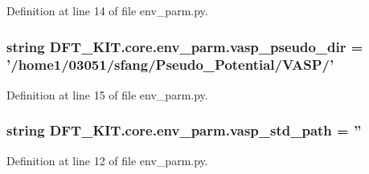 Definition at line 14 of file env\+\_\+parm.\+py.

\hypertarget{namespace_d_f_t___k_i_t_1_1core_1_1env__parm_a26bb9fdc8120f072bc91604e594bdd69}{
\subsubsection[{vasp\+\_\+pseudo\+\_\+dir}]{\setlength{\rightskip}{0pt plus 5cm}string D\+F\+T\+\_\+\+K\+I\+T.\+core.\+env\+\_\+parm.\+vasp\+\_\+pseudo\+\_\+dir = '/home1/03051/sfang/Pseudo\+\_\+\+Potential/V\+A\+S\+P/'}}\label{namespace_d_f_t___k_i_t_1_1core_1_1env__parm_a26bb9fdc8120f072bc91604e594bdd69}


Definition at line 15 of file env\+\_\+parm.\+py.

\hypertarget{namespace_d_f_t___k_i_t_1_1core_1_1env__parm_ad9178a1c98b53b32a1cdd1937c614aa7}{
\subsubsection[{vasp\+\_\+std\+\_\+path}]{\setlength{\rightskip}{0pt plus 5cm}string D\+F\+T\+\_\+\+K\+I\+T.\+core.\+env\+\_\+parm.\+vasp\+\_\+std\+\_\+path = ''}}\label{namespace_d_f_t___k_i_t_1_1core_1_1env__parm_ad9178a1c98b53b32a1cdd1937c614aa7}


Definition at line 12 of file env\+\_\+parm.\+py.

